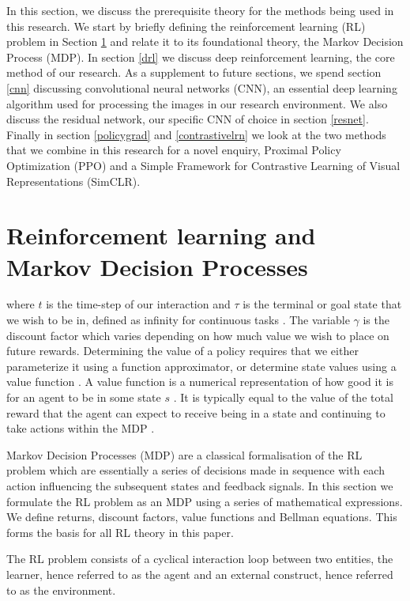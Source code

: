 \documentclass[a4paper,twoside,12pt]{report}
\begin{document}
In this section, we discuss the prerequisite theory for the methods being used in this research. We start by briefly defining the reinforcement learning (RL) problem in Section \ref{mdp} and relate it to its foundational theory, the Markov Decision Process (MDP). In section \ref{drl} we discuss deep reinforcement learning, the core method of our research. As a supplement to future sections, we spend section \ref{cnn} discussing convolutional neural networks (CNN), an essential deep learning algorithm used for processing the images in our research environment. We also discuss the residual network, our specific CNN of choice in section \ref{resnet}. Finally in section \ref{policygrad} and \ref{contrastivelrn} we look at the two methods that we combine in this research for a novel enquiry, Proximal Policy Optimization (PPO) and a Simple Framework for Contrastive Learning of Visual Representations (SimCLR). 

\section{Reinforcement learning and Markov Decision Processes}
\label{mdp}

where $t$ is the time-step of our interaction and $\tau$ is the terminal or goal state that we wish to be in, defined as infinity for continuous tasks \citep{janner2019trust}. The variable $\gamma$ is the discount factor which varies depending on how much value we wish to place on future rewards. Determining the value of a policy requires that we either parameterize it using a function approximator, or determine state values using a value function \citep{moderndrl}. A value function is a numerical representation of how good it is for an agent to be in some state $s$ \citep{moderndrl}. It is typically equal to the value of the total reward that the agent can expect to receive being in a state and continuing to take actions within the MDP \citep{sutton_barto_2018}. 

Markov Decision Processes (MDP) are a classical formalisation of the RL problem which are essentially a series of decisions made in sequence with each action influencing the subsequent states and feedback signals. In this section we formulate the RL problem as an MDP using a series of mathematical expressions. We define returns, discount factors, value functions and Bellman equations. This forms the basis for all RL theory in this paper.


The RL problem consists of a cyclical interaction loop between two entities, the learner, hence referred to as the agent  and an external construct, hence referred to as the environment.
\end{document}
